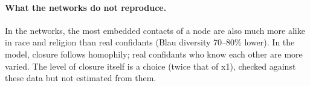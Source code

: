 \paragraph{What the networks do not reproduce.} In the networks, the most embedded
contacts of a node are also much more alike in race and religion than real confidants
(Blau diversity 70--80\% lower). In the model, closure follows homophily; real
confidants who know each other are more varied. The level of closure itself is a
choice (twice that of x1), checked against these data but not estimated from them.

\begin{table}[htbp]
\centering
\scriptsize
\caption{Held-out validation: GSS 2004 confidants of half B vs.\ 24 networks per level
built with the targets of half A. Error: predicted/observed $- 1$; in bold when its 95\%
interval (bootstrap of respondents and networks) excludes zero. Rows with a rule in
parentheses compare $k = \min(\text{confidants}, 5)$ contacts of nodes matched by race
and degree rank; the other rows use all contacts. x2g: global rewiring (not used).}
\label{tab:validation}

\end{table}
